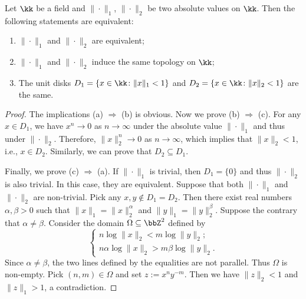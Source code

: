     \begin{lemma}\label{prop:equivalent_of_absolute_values_and_topology_and_unit_disk}
        Let \(\kk\) be a field and \(\|\cdot\|_1\), \(\|\cdot\|_2\) be two absolute values on \(\kk\).
        Then the following statements are equivalent:
        \begin{enumerate}
            \item \(\|\cdot\|_1\) and \(\|\cdot\|_2\) are equivalent;
            \item \(\|\cdot\|_1\) and \(\|\cdot\|_2\) induce the same topology on \(\kk\);
            \item The unit disks \(D_1 = \{x \in \kk\colon \|x\|_1 < 1\}\) and \(D_2 = \{x \in \kk\colon \|x\|_2 < 1\}\) are the same.
        \end{enumerate}
    \end{lemma}
    \begin{proof}
        The implications (a) \(\Rightarrow\) (b) is obvious.
        Now we prove (b) \(\Rightarrow\) (c).
        For any \(x \in D_1\), we have \(x^n \to 0\) as \(n \to \infty\) under the absolute value \(\|\cdot\|_1\) and thus under \(\|\cdot\|_2\).
        Therefore, \(\|x\|_2^n \to 0\) as \(n \to \infty\), which implies that \(\|x\|_2 < 1\), i.e., \(x \in D_2\).
        Similarly, we can prove that \(D_2 \subseteq D_1\).

        Finally, we prove (c) \(\Rightarrow\) (a).
        If \(\|\cdot\|_1\) is trivial, then \(D_1 = \{0\}\) and thus \(\|\cdot\|_2\) is also trivial.
        In this case, they are equivalent.
        Suppose that both \(\|\cdot\|_1\) and \(\|\cdot\|_2\) are non-trivial.
        Pick any \(x,y \notin D_1 = D_2\).
        Then there exist real numbers \(\alpha, \beta > 0\) such that \(\|x\|_1 = \|x\|_2^\alpha\) and \(\|y\|_1 = \|y\|_2^\beta\).
        Suppose the contrary that \(\alpha \neq \beta\).
        Consider the domain \(\Omega \subseteq \bbZ^2\) defined by
        \[ \begin{cases}
            n \log \|x\|_2 < m \log \|y\|_2; \\
            n \alpha \log \|x\|_2 > m \beta \log \|y\|_2.
        \end{cases} \]
        Since \(\alpha \neq \beta\), the two lines defined by the equalities are not parallel.
        Thus \(\Omega\) is non-empty.
        Pick \((n,m) \in \Omega\) and set \(z := x^n y^{-m}\).
        Then we have \(\|z\|_2 < 1\) and \(\|z\|_1 > 1\), a contradiction.
    \end{proof}


